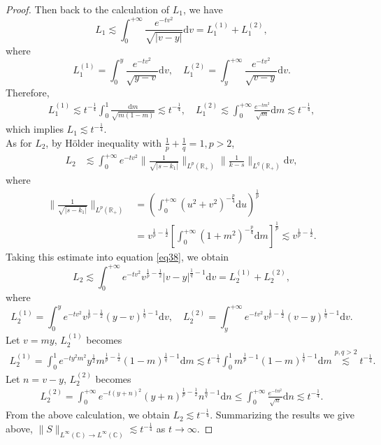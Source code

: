 \documentclass[11pt]{article}
\numberwithin{equation}{section}
\begin{document}
\begin{proof}
Then back to the calculation of $L_1$, we have
\begin{equation}
    L_1\lesssim\int_0^{+\infty}\frac{e^{-t v^2}}{\sqrt{|v-y|}}\mathrm{d}v=L_1^{(1)}+L_1^{(2)},
\end{equation}
where
\begin{equation*}
     L_1^{(1)}=\int_0^{y}\frac{e^{-t v^2}}{\sqrt{y-v}}\mathrm{d}v,\quad L_1^{(2)}=\int_y^{+\infty}\frac{e^{-t v^2}}{\sqrt{v-y}}\mathrm{d}v.
\end{equation*}
Therefore,
\begin{align*}
     L_1^{(1)}\lesssim t^{-\frac{1}{4}}\int_0^1\frac{\mathrm{d}m}{\sqrt{m(1-m)}}\lesssim t^{-\frac{1}{4}},\quad L_1^{(2)}\lesssim \int_0^{+\infty}\frac{e^{-tm^2}}{\sqrt{m}}\mathrm{d}m\lesssim t^{-\frac{1}{4}},
\end{align*}
which implies $L_1\lesssim t^{-\frac{1}{4}}$.\\
As for $L_2$, by H\"older inequality with $\frac{1}{p} + \frac{1}{q} = 1,p>2$,
\begin{align}\label{eq38}
    L_2&\lesssim \int_0^{+\infty}e^{-t v^2}\|\frac{1}{\sqrt{|s-k_1|}}\|_{L^p(\mathbb{R}_+)}\|\frac{1}{k-s}\|_{L^q(\mathbb{R}_+)}\mathrm{d}v,
\end{align}
where
\begin{align*}
    \|\frac{1}{\sqrt{|s-k_1|}}\|_{L^p(\mathbb{R}_+)}&=\left(\int_0^{+\infty}\left(u^2+v^2\right)^{-\frac{p}{4}}\mathrm{d}u\right)^{\frac{1}{p}}\\
    &=v^{\frac{1}{p}-\frac{1}{2}}\left[\int_0^{+\infty}\left(1+m^2\right)^{-\frac{p}{4}}\mathrm{d}m\right]^{\frac{1}{p}}\lesssim v^{\frac{1}{p}-\frac{1}{2}}.
\end{align*}
Taking this estimate into equation \eqref{eq38}, we obtain
\begin{equation*}
    L_2\lesssim\int_0^{+\infty}e^{-t v^2}v^{\frac{1}{p}-\frac{1}{2}}|v-y|^{\frac{1}{q}-1}\mathrm{d}v=L_2^{(1)}+L_2^{(2)},
\end{equation*}
where
\begin{equation*}
    L_2^{(1)}=\int_0^{y}e^{-t v^2}v^{\frac{1}{p}-\frac{1}{2}}(y-v)^{\frac{1}{q}-1}\mathrm{d}v,\quad L_2^{(2)}=\int_y^{+\infty}e^{-t v^2}v^{\frac{1}{p}-\frac{1}{2}}(v-y)^{\frac{1}{q}-1}\mathrm{d}v.
\end{equation*}
Let $v=my$,  $L_2^{(1)}$ becomes
\begin{align*}
    L_2^{(1)}=\int_0^1e^{- ty^2m^2}y^{\frac{1}{2}}m^{\frac{1}{p}-\frac{1}{2}}(1-m)^{\frac{1}{q}-1}\mathrm{d}m\lesssim t^{-\frac{1}{4}}\int_0^1m^{\frac{1}{p}-1}(1-m)^{\frac{1}{q}-1}\mathrm{d}m\overset{{p,q>2}}\lesssim t^{-\frac{1}{4}}.
\end{align*}
Let $n=v-y$,  $L_2^{(2)}$ becomes
\begin{align*}
    L_2^{(2)}=\int_0^{+\infty}e^{-t(y+n)^2}(y+n)^{\frac{1}{p}-\frac{1}{2}}n^{\frac{1}{q}-1}\mathrm{d}n\leqslant \int_0^{+\infty}\frac{e^{- tn^2}}{\sqrt{n}}\mathrm{d}n\lesssim t^{-\frac{1}{4}}.
\end{align*}
From the above calculation, we obtain $L_2\lesssim t^{-\frac{1}{4}}$. Summarizing the results we give above,  $\|S\|_{L^\infty(\mathbb{C}) \to L^\infty(\mathbb{C})} \lesssim t^{-\frac{1}{4}}$ as $t\to\infty$.
\end{proof}
\end{document}
